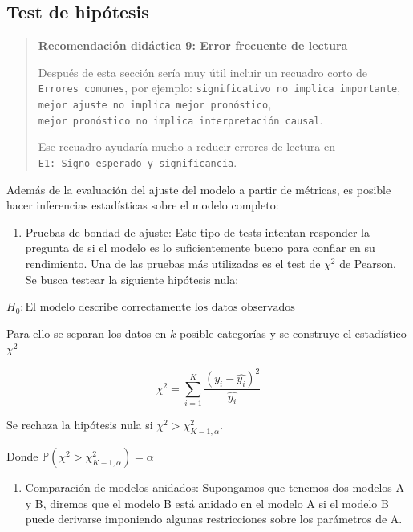 \documentclass[
]{book}
\providecommand{\tightlist}{%
  \setlength{\itemsep}{0pt}\setlength{\parskip}{0pt}}
\begin{document}
\hypertarget{test-de-hipuxf3tesis-1}{%
\subsection{Test de hipótesis}\label{test-de-hipuxf3tesis-1}}

\begin{quote}
\textbf{Recomendación didáctica 9: Error frecuente de lectura}

Después de esta sección sería muy útil incluir un recuadro corto de
\texttt{Errores\ comunes}, por ejemplo:
\texttt{significativo\ no\ implica\ importante},
\texttt{mejor\ ajuste\ no\ implica\ mejor\ pronóstico},
\texttt{mejor\ pronóstico\ no\ implica\ interpretación\ causal}.

Ese recuadro ayudaría mucho a reducir errores de lectura en \texttt{E1:\ Signo\ esperado\ y\ significancia}.
\end{quote}

Además de la evaluación del ajuste del modelo a partir de métricas, es
posible hacer inferencias estadísticas sobre el modelo completo:

\begin{enumerate}
\def\labelenumi{\arabic{enumi}.}
\tightlist
\item
  Pruebas de bondad de ajuste: Este tipo de tests intentan responder
  la pregunta de si el modelo es lo suficientemente bueno para confiar
  en su rendimiento. Una de las pruebas más utilizadas es el test de
  \(\chi ^2\) de Pearson. Se busca testear la siguiente hipótesis nula:
\end{enumerate}

\(H_0: \text{El modelo describe correctamente los datos observados}\)

Para ello se separan los datos en \(k\) posible categorías y se construye
el estadístico \(\chi^2\)

\[\chi^2 = \sum_{i = 1}^{K} \frac{(y_i - \hat{y_i})^2}{\hat{y_i}}\]

Se rechaza la hipótesis nula si \(\chi^2 > \chi^{2}_{K-1, α}\).

Donde \(\mathbb{P}(\chi^2 > \chi^{2}_{K-1, α}) = α\)

\begin{enumerate}
\def\labelenumi{\arabic{enumi}.}
\setcounter{enumi}{1}
\tightlist
\item
  Comparación de modelos anidados: Supongamos que tenemos dos modelos
  A y B, diremos que el modelo B está anidado en el modelo A si el
  modelo B puede derivarse imponiendo algunas restricciones sobre los
  parámetros de A.
\end{enumerate}
\end{document}
